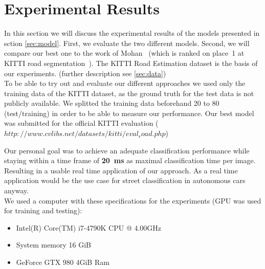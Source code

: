 
\section{Experimental Results}\label{sec:evaluation}

In this section we will discuss the experimental results of the models presented in sction \cref{sec:model}. First, we evaluate the two different models. Second, we will compare our best one to the work of Mohan~\cite{Tarel2009} (which is ranked on place~1 at KITTI road segmentation~\cite{Tarel2009}).
The KITTI Road Estimation dataset is the basis of our experiments. (further description see \cref{sec:data}) \\
To be able to try out and evaluate our different approaches we used only the training data of the KITTI dataset, as the ground truth for the test data is not publicly available. We splitted the training data beforehand 20 to 80 (test/training) in order to be able to measure our performance.
Our best model was submitted for the official KITTI evaluation ($http://www.cvlibs.net/datasets/kitti/eval_road.php$)


Our personal goal was to achieve an adequate classification performance while staying within a time frame of \textbf{\SI{20}{\milli\second}} as maximal classification time per image. Resulting in a usable real time application of our approach. As a real time application would be the use case for street classification in autonomous cars anyway.\\

We used a computer with these specifications for the experiments (GPU was used for training and testing):
\begin{itemize}
\item Intel(R) Core(TM) i7-4790K CPU @ 4.00GHz
\item System memory 16 GiB
\item GeForce GTX 980 4GiB Ram
\end{itemize}

